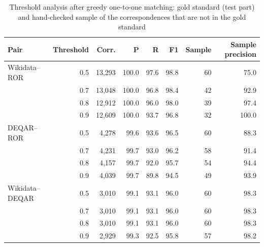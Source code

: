 \begin{table}[t]
\caption{Threshold analysis after greedy one-to-one matching: gold standard (test part) and hand-checked sample of the correspondences that are not in the gold standard}\label{tab:threshold}
\scriptsize
\setlength{\tabcolsep}{4pt}
\begin{tabular}{lrrrrrrr}
\toprule
Pair & Threshold & Corr. & P & R & F1 & Sample & Sample precision\\
\midrule
Wikidata--ROR & 0.5 & 13{,}293 & 100.0 & 97.6 & 98.8 & 60 & 75.0\\
 & 0.7 & 13{,}048 & 100.0 & 96.8 & 98.4 & 42 & 92.9\\
 & 0.8 & 12{,}912 & 100.0 & 96.0 & 98.0 & 39 & 97.4\\
 & 0.9 & 12{,}609 & 100.0 & 93.7 & 96.8 & 32 & 100.0\\
DEQAR--ROR & 0.5 & 4{,}278 & 99.6 & 93.6 & 96.5 & 60 & 88.3\\
 & 0.7 & 4{,}231 & 99.7 & 93.0 & 96.2 & 58 & 91.4\\
 & 0.8 & 4{,}157 & 99.7 & 92.0 & 95.7 & 54 & 94.4\\
 & 0.9 & 4{,}039 & 99.7 & 89.8 & 94.5 & 49 & 93.9\\
Wikidata--DEQAR & 0.5 & 3{,}010 & 99.1 & 93.1 & 96.0 & 60 & 98.3\\
 & 0.7 & 3{,}010 & 99.1 & 93.1 & 96.0 & 60 & 98.3\\
 & 0.8 & 3{,}010 & 99.1 & 93.1 & 96.0 & 60 & 98.3\\
 & 0.9 & 2{,}929 & 99.3 & 92.5 & 95.8 & 57 & 98.2\\
\bottomrule
\end{tabular}
\end{table}
